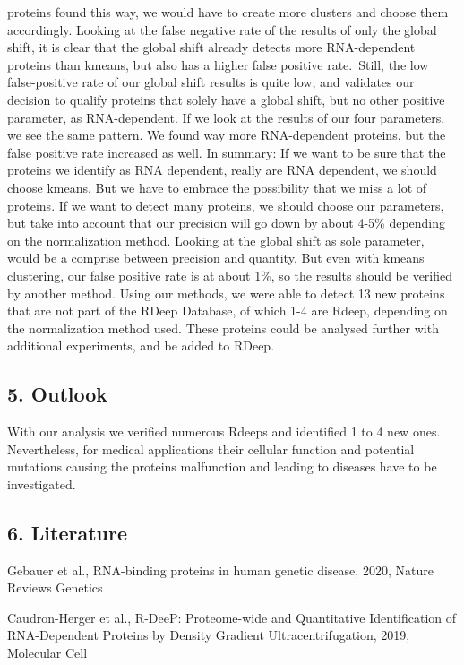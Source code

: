 \documentclass[
  12pt,
]{article}
\begin{document}
proteins found this way, we would have to create more clusters and
choose them accordingly. Looking at the false negative rate of the
results of only the global shift, it is clear that the global shift
already detects more RNA-dependent proteins than kmeans, but also has a
higher false positive rate.~Still, the low false-positive rate of our
global shift results is quite low, and validates our decision to qualify
proteins that solely have a global shift, but no other positive
parameter, as RNA-dependent. If we look at the results of our four
parameters, we see the same pattern. We found way more RNA-dependent
proteins, but the false positive rate increased as well. In summary: If
we want to be sure that the proteins we identify as RNA dependent,
really are RNA dependent, we should choose kmeans. But we have to
embrace the possibility that we miss a lot of proteins. If we want to
detect many proteins, we should choose our parameters, but take into
account that our precision will go down by about 4-5\% depending on the
normalization method. Looking at the global shift as sole parameter,
would be a comprise between precision and quantity. But even with kmeans
clustering, our false positive rate is at about 1\%, so the results
should be verified by another method. Using our methods, we were able to
detect 13 new proteins that are not part of the RDeep Database, of which
1-4 are Rdeep, depending on the normalization method used. These
proteins could be analysed further with additional experiments, and be
added to RDeep.

\hypertarget{outlook}{%
\subsection{5. Outlook}\label{outlook}}

With our analysis we verified numerous Rdeeps and identified 1 to 4 new
ones. Nevertheless, for medical applications their cellular function and
potential mutations causing the proteins malfunction and leading to
diseases have to be investigated.

\hypertarget{literature}{%
\subsection{6. Literature}\label{literature}}

Gebauer et al., RNA-binding proteins in human genetic disease, 2020,
Nature Reviews Genetics

Caudron-Herger et al., R-DeeP: Proteome-wide and Quantitative
Identification of RNA-Dependent Proteins by Density Gradient
Ultracentrifugation, 2019, Molecular Cell
\end{document}
